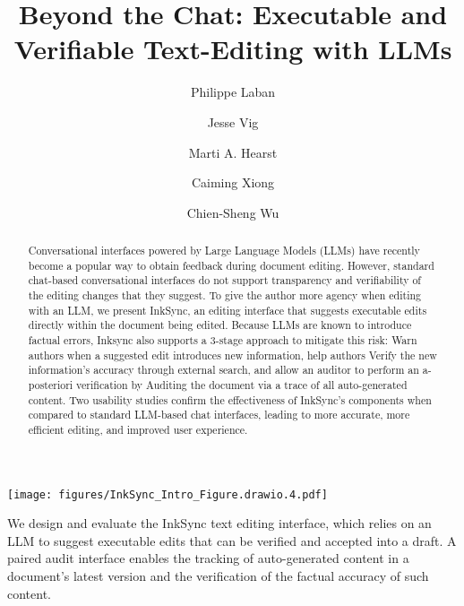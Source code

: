 \documentclass[manuscript]{acmart}
\begin{document}
\title{Beyond the Chat: Executable and Verifiable Text-Editing with LLMs}

\author{Philippe Laban}
\author{Jesse Vig}
\author{Marti A. Hearst}
\author{Caiming Xiong}
\author{Chien-Sheng Wu}

\begin{abstract}
Conversational interfaces powered by Large Language Models (LLMs) have recently become a popular way to obtain feedback during document editing. However, standard chat-based conversational interfaces do not support transparency and verifiability of the editing changes that they suggest. To give the author more agency when editing with an LLM, we present InkSync, an editing interface that suggests executable edits directly within the document being edited. Because LLMs are known to introduce factual errors, Inksync also supports a 3-stage approach to mitigate this risk: Warn authors when a suggested edit introduces new information, help authors Verify the new information's accuracy through external search, and allow an auditor to perform an a-posteriori verification by Auditing the document via a trace of all auto-generated content.
Two usability studies confirm the effectiveness of InkSync's components when compared to standard LLM-based chat interfaces, leading to more accurate, more efficient editing, and improved user experience.
\end{abstract}



\keywords{}

\begin{teaserfigure}
    \centering
    \texttt{[image: figures/InkSync\_Intro\_Figure.drawio.4.pdf]}
    \caption{We design and evaluate the InkSync text editing interface, which relies on an LLM to suggest executable edits that can be verified and accepted into a draft. A paired audit interface enables the tracking of auto-generated content in a document's latest version and the verification of the factual accuracy of such content.} %
    \label{fig:intro_figure}
\end{teaserfigure}
\end{document}
